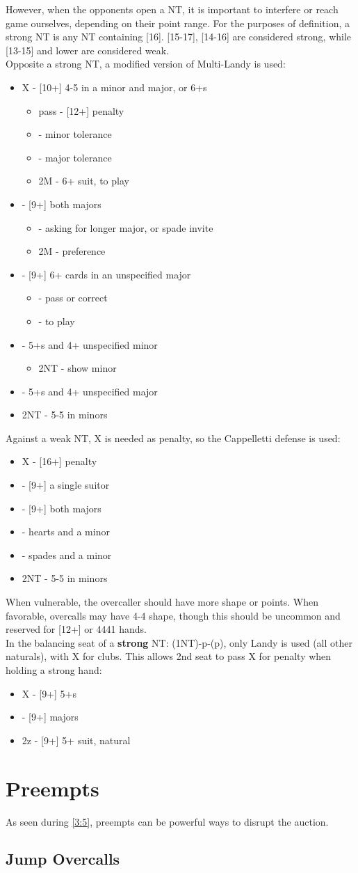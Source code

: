 \documentclass[12pt]{report}
\newcommand{\n}{\\}
\newcommand{\q}[1]{\multido{}{#1}{\qquad}}
\newcommand{\ul}[1]{\begin{itemize}#1\end{itemize}}
\newcommand{\li}[1]{\item[~] \q{#1}}
\begin{document}
    However, when the opponents open a NT, it is important to interfere or reach game ourselves, depending on their point range.  For the purposes of definition, a strong NT is any NT containing [16].  [15-17], [14-16] are considered strong, while [13-15] and lower are considered weak. \n

    Opposite a strong NT, a modified version of Multi-Landy is used:
    \ul {
        \li0 X - [10+] 4-5 in a minor and major, or 6+\di{}s
        \ul {
            \li0 pass - [12+] penalty
            \li0 \cl2 - minor tolerance
            \li0 \di2 - major tolerance
            \li0 2M - 6+ suit, to play
        }
        \li0 \cl2 - [9+] both majors
        \ul {
            \li0 \di2 - asking for longer major, or spade invite
            \li0 2M - preference
        }
        \li0 \di2 - [9+] 6+ cards in an unspecified major
        \ul {
            \li0 \he2 - pass or correct
            \li0 \sp2 - to play
        }
        \li0 \he2 - 5+\he{}s and 4+ unspecified minor
        \ul {
            \li0 2NT - show minor
        }
        \li0 \sp2 - 5+\sp{}s and 4+ unspecified major
        \li0 2NT - 5-5 in minors
    }

    Against a weak NT, X is needed as penalty, so the Cappelletti defense is used:
    \ul {
        \li0 X - [16+] penalty
        \li0  - [9+] a single suitor
        \li0 \di2 - [9+] both majors
        \li0 \he2 - hearts and a minor
        \li0 \sp2 - spades and a minor
        \li0 2NT - 5-5 in minors
    }

    When vulnerable, the overcaller should have more shape or points.  When favorable, overcalls may have 4-4 shape, though this should be uncommon and reserved for [12+] or 4441 hands. \n

    In the balancing seat of a \textbf{strong} NT: (1NT)-p-(p), only Landy is used (all other naturals), with X for clubs.  This allows 2nd seat to pass X for penalty when holding a strong hand:
    \ul {
        \li0 X - [9+] 5+\cl{}s
        \li0  - [9+] majors
        \li0 2z - [9+] 5+ suit, natural
    }

\section{Preempts} \label{4:5}

    As seen during \ref{3:5}, preempts can be powerful ways to disrupt the auction.

\subsection{Jump Overcalls}
    
\end{document}
